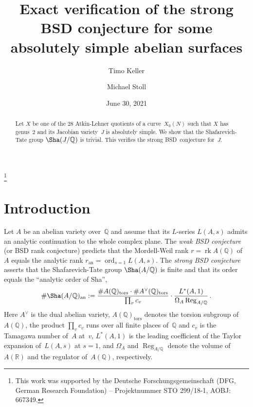 \documentclass{amsart}
\newcommand{\Q}{{\mathbb{Q}}}
\newcommand{\R}{{\mathbb{R}}}
\newcommand{\rk}{\operatorname{rk}}
\newcommand{\an}{{\mathrm{an}}}
\newcommand{\tors}{{\mathrm{tors}}}
\newcommand{\Reg}{\operatorname{Reg}}
\newcommand{\ord}{\operatorname{ord}}
\begin{document}
\title[Exact verification of strong BSD for some modular abelian surfaces]{Exact verification of the strong BSD conjecture for some absolutely simple abelian surfaces}

\author[T. Keller]{Timo Keller} 
\author[M. Stoll]{Michael Stoll} 
\address{Lehrstuhl Mathematik~II (Computeralgebra), Universität Bayreuth, Universitätsstraße 30, 95440 Bayreuth, Germany}

\thanks{This work was supported by the Deutsche Forschungsgemeinschaft (DFG, German Research Foundation) -- Projektnummer STO 299/18-1, AOBJ: 667349.}

\date{June 30, 2021}

	
	\begin{abstract}
		Let $X$ be one of the $28$ Atkin-Lehner quotients of a curve~$X_0(N)$
		such that $X$ has genus~$2$ and its Jacobian variety~$J$ is
		absolutely simple. We show that the Shafarevich-Tate group $\Sha(J/\Q)$
		is trivial. This verifies the strong BSD~conjecture for~$J$.
	\end{abstract}

	\maketitle

	\section{Introduction}
	
	Let $A$ be an abelian variety over~$\Q$ and assume that its $L$-series
	$L(A,s)$ admits an analytic continuation to the whole complex plane.
	The \emph{weak BSD conjecture} (or BSD rank conjecture) predicts that
	the Mordell-Weil rank $r = \rk A(\Q)$ of~$A$ equals the analytic rank
	$r_{\an} = \ord_{s=1} L(A, s)$. The \emph{strong BSD conjecture}
	asserts that the Shafarevich-Tate group $\Sha(A/\Q)$ is finite and that
	its order equals the ``analytic order of Sha'',
	\begin{equation} \label{Sha_an}
		\#\Sha(A/\Q)_{\an} := \frac{\#A(\Q)_{\tors} \cdot \#A^\vee(\Q)_{\tors}}{\prod_v c_v}
		\cdot \frac{L^*(A, 1)}{\Omega_A \Reg_{A/\Q}} \,.
	\end{equation}
	Here $A^\vee$ is the dual abelian variety, $A(\Q)_{\tors}$ denotes the
	torsion subgroup of~$A(\Q)$, the product $\prod_v c_v$ runs over all finite
	places of~$\Q$ and $c_v$ is the Tamagawa number of~$A$ at~$v$, $L^*(A, 1)$
	is the leading coefficient of the Taylor expansion of~$L(A, s)$ at $s =
	1$,
	and $\Omega_A$ and $\Reg_{A/\Q}$ denote the volume of~$A(\R)$ and the
	regulator of~$A(\Q)$, respectively.
	
\end{document}
